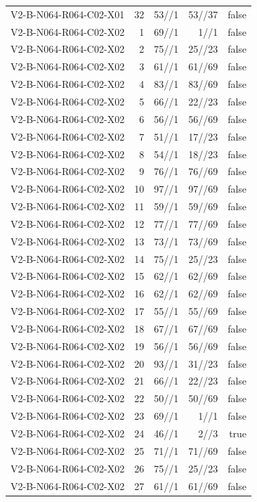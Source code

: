 {\begin{longtable}{lrrrr}
V2-B-N064-R064-C02-X01 & 32 & 53//1 & 53//37 & false \\
V2-B-N064-R064-C02-X02 & 1 & 69//1 & 1//1 & false \\
V2-B-N064-R064-C02-X02 & 2 & 75//1 & 25//23 & false \\
V2-B-N064-R064-C02-X02 & 3 & 61//1 & 61//69 & false \\
V2-B-N064-R064-C02-X02 & 4 & 83//1 & 83//69 & false \\
V2-B-N064-R064-C02-X02 & 5 & 66//1 & 22//23 & false \\
V2-B-N064-R064-C02-X02 & 6 & 56//1 & 56//69 & false \\
V2-B-N064-R064-C02-X02 & 7 & 51//1 & 17//23 & false \\
V2-B-N064-R064-C02-X02 & 8 & 54//1 & 18//23 & false \\
V2-B-N064-R064-C02-X02 & 9 & 76//1 & 76//69 & false \\
V2-B-N064-R064-C02-X02 & 10 & 97//1 & 97//69 & false \\
V2-B-N064-R064-C02-X02 & 11 & 59//1 & 59//69 & false \\
V2-B-N064-R064-C02-X02 & 12 & 77//1 & 77//69 & false \\
V2-B-N064-R064-C02-X02 & 13 & 73//1 & 73//69 & false \\
V2-B-N064-R064-C02-X02 & 14 & 75//1 & 25//23 & false \\
V2-B-N064-R064-C02-X02 & 15 & 62//1 & 62//69 & false \\
V2-B-N064-R064-C02-X02 & 16 & 62//1 & 62//69 & false \\
V2-B-N064-R064-C02-X02 & 17 & 55//1 & 55//69 & false \\
V2-B-N064-R064-C02-X02 & 18 & 67//1 & 67//69 & false \\
V2-B-N064-R064-C02-X02 & 19 & 56//1 & 56//69 & false \\
V2-B-N064-R064-C02-X02 & 20 & 93//1 & 31//23 & false \\
V2-B-N064-R064-C02-X02 & 21 & 66//1 & 22//23 & false \\
V2-B-N064-R064-C02-X02 & 22 & 50//1 & 50//69 & false \\
V2-B-N064-R064-C02-X02 & 23 & 69//1 & 1//1 & false \\
V2-B-N064-R064-C02-X02 & 24 & 46//1 & 2//3 & true \\
V2-B-N064-R064-C02-X02 & 25 & 71//1 & 71//69 & false \\
V2-B-N064-R064-C02-X02 & 26 & 75//1 & 25//23 & false \\
V2-B-N064-R064-C02-X02 & 27 & 61//1 & 61//69 & false \\

\end{longtable}}
